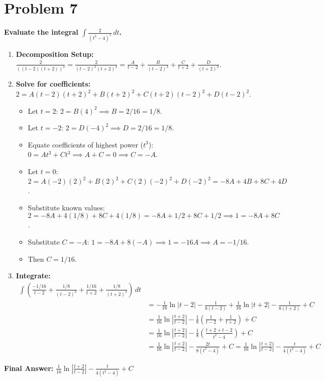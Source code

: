 \documentclass{article}
\begin{document}
\section{Problem 7}
\textbf{Evaluate the integral $\displaystyle\int \frac{2}{(t^2-4)^2} \,dt$.}
\begin{enumerate}
    \item \textbf{Decomposition Setup:} $\displaystyle\frac{2}{((t-2)(t+2))^2} = \frac{2}{(t-2)^2(t+2)^2} = \frac{A}{t-2} + \frac{B}{(t-2)^2} + \frac{C}{t+2} + \frac{D}{(t+2)^2}$.
    \item \textbf{Solve for coefficients:} $2 = A(t-2)(t+2)^2 + B(t+2)^2 + C(t+2)(t-2)^2 + D(t-2)^2$.
    \begin{itemize}
        \item Let $t=2$: $2 = B(4)^2 \implies B=2/16=1/8$.
        \item Let $t=-2$: $2 = D(-4)^2 \implies D=2/16=1/8$.
        \item Equate coefficients of highest power ($t^3$): $0 = At^3 + Ct^3 \implies A+C=0 \implies C=-A$.
        \item Let $t=0$: $2 = A(-2)(2)^2 + B(2)^2 + C(2)(-2)^2 + D(-2)^2 = -8A+4B+8C+4D$.
        \item Substitute known values: $2 = -8A + 4(1/8) + 8C + 4(1/8) = -8A+1/2+8C+1/2 \implies 1 = -8A+8C$.
        \item Substitute $C=-A$: $1 = -8A+8(-A) \implies 1 = -16A \implies A=-1/16$.
        \item Then $C = 1/16$.
    \end{itemize}
    \item \textbf{Integrate:}
    \begin{align*}
    \int \left( \frac{-1/16}{t-2} + \frac{1/8}{(t-2)^2} + \frac{1/16}{t+2} + \frac{1/8}{(t+2)^2} \right) \,dt \\
    &= -\frac{1}{16}\ln|t-2| - \frac{1}{8(t-2)} + \frac{1}{16}\ln|t+2| - \frac{1}{8(t+2)} + C \\
    &= \frac{1}{16}\ln\left|\frac{t+2}{t-2}\right| - \frac{1}{8}\left(\frac{1}{t-2} + \frac{1}{t+2}\right) + C \\
    &= \frac{1}{16}\ln\left|\frac{t+2}{t-2}\right| - \frac{1}{8}\left(\frac{t+2+t-2}{t^2-4}\right) + C \\
    &= \frac{1}{16}\ln\left|\frac{t+2}{t-2}\right| - \frac{2t}{8(t^2-4)} + C = \frac{1}{16}\ln\left|\frac{t+2}{t-2}\right| - \frac{t}{4(t^2-4)} + C
    \end{align*}
\end{enumerate}
\textbf{Final Answer:} $\displaystyle\frac{1}{16}\ln\left|\frac{t+2}{t-2}\right| - \frac{t}{4(t^2-4)} + C$
\end{document}
